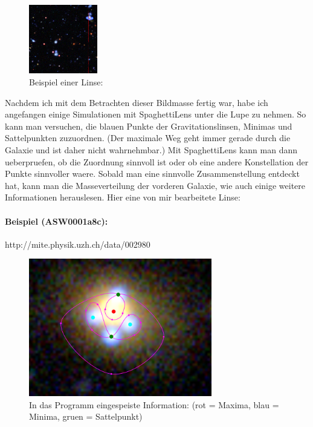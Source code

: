 \documentclass[pdftex,12pt,a4paper]{article}
\begin{document}
\begin{figure}[position=h]
\centering
 \caption{Beispiel einer Linse:}
 \includegraphics[trim = 128mm 116mm 8mm 14mm, clip, width=3cm]{Bilder/lol}%
\end{figure}
\newpage Nachdem ich mit dem Betrachten dieser Bildmasse fertig war, habe ich angefangen einige Simulationen mit SpaghettiLens unter die Lupe zu nehmen.
So kann man versuchen, die blauen Punkte der Gravitationslinsen, Minimas und Sattelpunkten zuzuordnen.
(Der maximale Weg geht immer gerade durch die Galaxie und ist daher nicht wahrnehmbar.)
Mit SpaghettiLens kann man dann ueberpruefen, ob die Zuordnung sinnvoll ist oder ob eine andere Konstellation der Punkte sinnvoller waere.
Sobald man eine sinnvolle Zusammenstellung entdeckt hat, kann man die Masseverteilung der vorderen Galaxie, wie auch einige weitere Informationen herauslesen.
Hier eine von mir bearbeitete Linse:


\paragraph{Beispiel (ASW0001a8c):}
http://mite.physik.uzh.ch/data/002980

\begin{figure}[position=h]
\centering
 \caption{In das Programm eingespeiste Information:\newline
  (rot = Maxima, blau = Minima, gruen = Sattelpunkt)}
 \includegraphics[trim = 40mm 50mm 60mm 40mm, clip, width=8cm]{Bilder/workinput}%
\end{figure}
\end{document}
